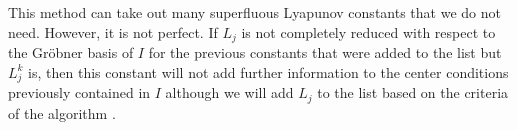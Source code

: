 \begin{observacio}
This method can take out many superfluous Lyapunov constants that we do not need. However, it is not perfect. If $L_j$ is not completely reduced with respect to the Gröbner basis of $I$ for the previous constants that were added to the list but $L_j^k$ is, then this constant will not add further information to the center conditions previously contained in $I$ although we will add $L_j$ to the list based on the criteria of the algorithm \parencite{Gasull2001}.
\end{observacio}










